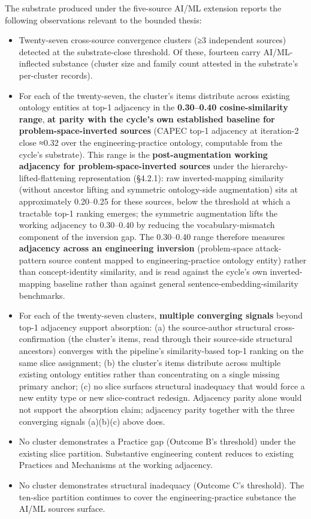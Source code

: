\documentclass[
]{article}
\providecommand{\tightlist}{%
  \setlength{\itemsep}{0pt}\setlength{\parskip}{0pt}}
\begin{document}
The substrate produced under the five-source AI/ML extension reports the
following observations relevant to the bounded thesis:

\begin{itemize}
\tightlist
\item
  Twenty-seven cross-source convergence clusters (≥3 independent
  sources) detected at the substrate-close threshold. Of these, fourteen
  carry AI/ML-inflected substance (cluster size and family count
  attested in the substrate's per-cluster records).
\item
  For each of the twenty-seven, the cluster's items distribute across
  existing ontology entities at top-1 adjacency in the
  \textbf{0.30--0.40 cosine-similarity range}, \textbf{at parity with
  the cycle's own established baseline for problem-space-inverted
  sources} (CAPEC top-1 adjacency at iteration-2 close ≈0.32 over the
  engineering-practice ontology, computable from the cycle's substrate).
  This range is the \textbf{post-augmentation working adjacency for
  problem-space-inverted sources} under the hierarchy-lifted-flattening
  representation (§4.2.1): raw inverted-mapping similarity (without
  ancestor lifting and symmetric ontology-side augmentation) sits at
  approximately 0.20--0.25 for these sources, below the threshold at
  which a tractable top-1 ranking emerges; the symmetric augmentation
  lifts the working adjacency to 0.30--0.40 by reducing the
  vocabulary-mismatch component of the inversion gap. The 0.30--0.40
  range therefore measures \textbf{adjacency across an engineering
  inversion} (problem-space attack-pattern source content mapped to
  engineering-practice ontology entity) rather than concept-identity
  similarity, and is read against the cycle's own inverted-mapping
  baseline rather than against general sentence-embedding-similarity
  benchmarks.
\item
  For each of the twenty-seven clusters, \textbf{multiple converging
  signals} beyond top-1 adjacency support absorption: (a) the
  source-author structural cross-confirmation (the cluster's items, read
  through their source-side structural ancestors) converges with the
  pipeline's similarity-based top-1 ranking on the same slice
  assignment; (b) the cluster's items distribute across multiple
  existing ontology entities rather than concentrating on a single
  missing primary anchor; (c) no slice surfaces structural inadequacy
  that would force a new entity type or new slice-contract redesign.
  Adjacency parity alone would not support the absorption claim;
  adjacency parity together with the three converging signals (a)(b)(c)
  above does.
\item
  No cluster demonstrates a Practice gap (Outcome B's threshold) under
  the existing slice partition. Substantive engineering content reduces
  to existing Practices and Mechanisms at the working adjacency.
\item
  No cluster demonstrates structural inadequacy (Outcome C's threshold).
  The ten-slice partition continues to cover the engineering-practice
  substance the AI/ML sources surface.
\end{itemize}
\end{document}
